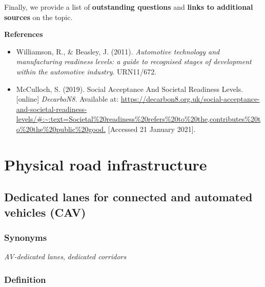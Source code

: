 \documentclass[
]{book}
\providecommand{\tightlist}{%
  \setlength{\itemsep}{0pt}\setlength{\parskip}{0pt}}
\begin{document}
Finally, we provide a list of \textbf{outstanding questions} and \textbf{links to additional sources} on the topic.

\textbf{References}

\begin{itemize}
\tightlist
\item
  Williamson, R., \& Beasley, J. (2011). \emph{Automotive technology and manufacturing readiness levels: a guide to recognised stages of development within the automotive industry}. URN11/672.
\item
  McCulloch, S. (2019). Social Acceptance And Societal Readiness Levels. {[}online{]} \emph{DecarboN8}. Available at: \url{https://decarbon8.org.uk/social-acceptance-and-societal-readiness-levels/\#:~:text=Societal\%20readiness\%20refers\%20to\%20the,contributes\%20to\%20the\%20public\%20good.} {[}Accessed 21 January 2021{]}.
\end{itemize}

\hypertarget{infrastructure}{%
\chapter{Physical road infrastructure}\label{infrastructure}}

\hypertarget{dedicated_lanes}{%
\section{Dedicated lanes for connected and automated vehicles (CAV)}\label{dedicated_lanes}}

\hypertarget{synonyms}{%
\subsection*{Synonyms}\label{synonyms}}

\emph{AV-dedicated lanes}, \emph{dedicated corridors}

\hypertarget{definition}{%
\subsection*{Definition}\label{definition}}
\end{document}
